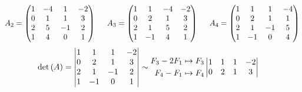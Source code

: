 \begin{enumerate}[label=\listAlph]
\[                A_2 = 
                \begin{pmatrix}
                    1 & -4 & 1 & -2 \\
                    0 & 1 & 1 & 3 \\
                    2 & 5 & -1 & 2 \\
                    1 & 4 & 0 & 1
                \end{pmatrix}
                \hspace{0.5cm}
                A_3 = 
                \begin{pmatrix}
                    1 & 1 & -4 & -2 \\
                    0 & 2 & 1 & 3 \\
                    2 & 1 & 5 & 2 \\
                    1 & -1 & 4 & 1
                \end{pmatrix}
                \hspace{0.5cm}
                A_4 = 
                \begin{pmatrix}
                    1 & 1 & 1 & -4 \\
                    0 & 2 & 1 & 1 \\
                    2 & 1 & -1 & 5 \\
                    1 & -1 & 0 & 4
                \end{pmatrix}
            \]
            \[
                \begin{aligned}
                    \text{det} \left( A \right)
                    &= 
                    \begin{vmatrix}
                        1 & 1 & 1 & -2 \\
                        0 & 2 & 1 & 3 \\
                        2 & 1 & -1 & 2 \\
                        1 & -1 & 0 & 1
                    \end{vmatrix}
                    \sim 
                    \begin{aligned}
                        F_3 - 2F_1 &\mapsto F_3 \\
                        F_4 - F_1 &\mapsto F_4 \\
                    \end{aligned}
                    \begin{vmatrix}
                        1 & 1 & 1 & -2 \\
                        0 & 2 & 1 & 3 \\

\end{vmatrix}
\end{aligned}\]
\end{enumerate}
